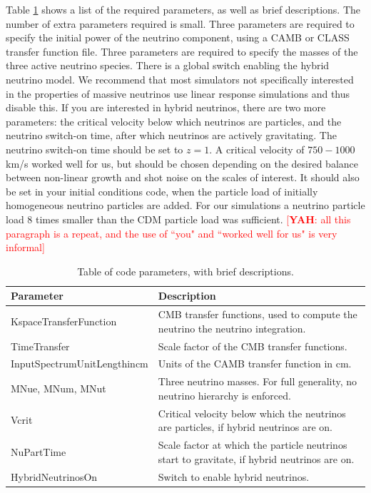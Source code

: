 \documentclass[useAMS, usenatbib]{mnras}
\newcommand{\yah}[1]{{\textcolor{red}{[{\bf YAH}: #1]}}}
\begin{document}
Table \ref{tab:parameters} shows a list of the required parameters, as well as brief descriptions. The number of extra parameters required is small. Three parameters are required to specify the initial power of the neutrino component, using a CAMB or CLASS transfer function file. Three parameters are required to specify the masses of the three active neutrino species.
There is a global switch enabling the hybrid neutrino model. We recommend that most simulators not specifically interested in the properties of massive neutrinos use linear response simulations and thus disable this. If you are interested in hybrid neutrinos, there are two more parameters: the critical velocity below which neutrinos are particles, and the neutrino switch-on time, after which neutrinos are actively gravitating. The neutrino switch-on time should be set to $z=1$. A critical velocity of $750-1000$ km/s worked well for us, but should be chosen depending on the desired balance between non-linear growth and shot noise on the scales of interest.
It should also be set in your initial conditions code, when the particle load of initially homogeneous neutrino particles are added.
For our simulations a neutrino particle load $8$ times smaller than the CDM particle load was sufficient. \yah{all this paragraph is a repeat, and the use of ``you" and ``worked well for us" is very informal}

\begin{table}
\begin{center}
\begin{tabular}{|l|l|}
\hline
    Parameter & Description \\
\hline
KspaceTransferFunction   & CMB transfer functions, used to compute the neutrino the neutrino integration. \\
TimeTransfer             & Scale factor of the CMB transfer functions. \\
InputSpectrumUnitLengthincm   & Units of the CAMB transfer function in cm. \\
MNue, MNum, MNut &  Three neutrino masses. For full generality, no neutrino  hierarchy is enforced. \\
Vcrit            & Critical velocity below which the neutrinos are particles, if hybrid neutrinos are on. \\
NuPartTime       & Scale factor at which the particle neutrinos start to gravitate, if hybrid neutrinos are on. \\
HybridNeutrinosOn       & Switch to enable hybrid neutrinos. \\
\hline
\end{tabular}
\end{center}
\caption{Table of code parameters, with brief descriptions.}
\label{tab:parameters}
\end{table}
\end{document}
